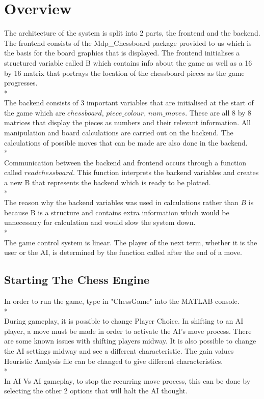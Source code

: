 \documentclass[11pt,a4paper]{article}
\begin{document}
\newpage
\section{Overview}
\indent\indent The architecture of the system is split into 2 parts, the frontend and the backend. The frontend consists of the Mdp\_Chessboard package provided to us which is the basis for the board graphics that is displayed. The frontend initialises a structured variable called B which contains info about the game as well as a 16 by 16 matrix that portrays the location of the chessboard pieces as the game progresses. 
\\*\\
\indent The backend consists of 3 important variables that are initialised at the start of the game which are $chessboard$, $piece\_colour$, $num\_moves$. These are all 8 by 8 matrices that display the pieces as numbers and their relevant information. All manipulation and board calculations are carried out on the backend. The calculations of possible moves that can be made are also done in the backend.
\\*\\
\indent Communication between the backend and frontend occurs through a function called $readchessboard$. This function interprets the backend variables and creates a new B that represents the backend which is ready to be plotted.
\\*\\
\indent The reason why the backend variables was used in calculations rather than $B$ is because B is a structure and contains extra information which would be unnecessary for calculation and would slow the system down.
\\*\\
\indent The game control system is linear. The player of the next term, whether it is the user or the AI, is determined by the function called after the end of a move.
\subsection{Starting The Chess Engine}
\indent \indent In order to run the game, type in "ChessGame" into the MATLAB console.
\\*\\
\indent During gameplay, it is possible to change Player Choice. In shifting to an AI player, a move must be made in order to activate the AI's move process. There are some known issues with shifting players midway. It is also possible to change the AI settings midway and see a different characteristic. The gain values Heuristic Analysis file can be changed to give different characteristics.
\\*\\
\indent In AI Vs AI gameplay, to stop the recurring move process, this can be done by selecting the other 2 options that will halt the AI thought.
\newpage
\end{document}
